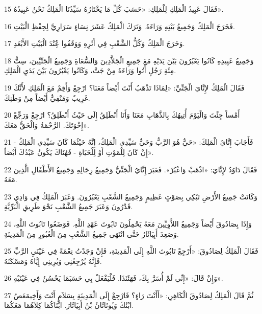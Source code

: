 \par 15 فَقَالَ عَبِيدُ الْمَلِكِ لِلْمَلِكِ: «حَسَبَ كُلِّ مَا يَخْتَارُهُ سَيِّدُنَا الْمَلِكُ نَحْنُ عَبِيدُهُ».
\par 16 فَخَرَجَ الْمَلِكُ وَجَمِيعُ بَيْتِهِ وَرَاءَهُ. وَتَرَكَ الْمَلِكُ عَشَرَ نِسَاءٍ سَرَارِيَّ لِحِفْظِ الْبَيْتِ.
\par 17 وَخَرَجَ الْمَلِكُ وَكُلُّ الشَّعْبِ فِي أَثَرِهِ وَوَقَفُوا عَُِنْدَ الْبَيْتِ الأَبْعَدِ.
\par 18 وَجَمِيعُ عَبِيدِهِ كَانُوا يَعْبُرُونَ بَيْنَ يَدَيْهِ مَعَ جَمِيعِ الْجَلاَّدِينَ وَالسُّعَاةِ وَجَمِيعُ الْجَتِّيِّينَ، سِتُّ مِئَةِ رَجُلٍ أَتُوا وَرَاءَهُ مِنْ جَتَّ، وَكَانُوا يَعْبُرُونَ بَيْنَ يَدَيِ الْمَلِكِ.
\par 19 فَقَالَ الْمَلِكُ لإِتَّايَ الْجَتِّيِّ: «لِمَاذَا تَذْهَبُ أَنْتَ أَيْضاً مَعَنَا؟ ارْجِعْ وَأَقِمْ مَعَ الْمَلِكِ لأَنَّكَ غَرِيبٌ وَمَنْفِيٌّ أَيْضاً مِنْ وَطَنِكَ.
\par 20 أَمْساً جِئْتَ وَالْيَوْمَ أُتِيهُكَ بِالذَّهَابِ مَعَنَا وَأَنَا أَنْطَلِقُ إِلَى حَيْثُ أَنْطَلِقُ؟ ارْجِعْ وَرَجِّعْ إِخْوَتَكَ. الرَّحْمَةُ وَالْحَقُّ مَعَكَ».
\par 21 فَأَجَابَ إِتَّايُ الْمَلِكَ: «حَيٌّ هُوَ الرَّبُّ وَحَيٌّ سَيِّدِي الْمَلِكُ، إِنَّهُ حَيْثُمَا كَانَ سَيِّدِي الْمَلِكُ - إِنْ كَانَ لِلْمَوْتِ أَوْ لِلْحَيَاةِ - فَهُنَاكَ يَكُونُ عَبْدُكَ أَيْضاً».
\par 22 فَقَالَ دَاوُدُ لإِتَّايَ: «اذْهَبْ وَاعْبُرْ». فَعَبَرَ إِتَّايُ الْجَتِّيُّ وَجَمِيعُ رِجَالِهِ وَجَمِيعُ الأَطْفَالِ الَّذِينَ مَعَهُ.
\par 23 وَكَانَتْ جَمِيعُ الأَرْضِ تَبْكِي بِصَوْتٍ عَظِيمٍ وَجَمِيعُ الشَّعْبِ يَعْبُرُونَ. وَعَبَرَ الْمَلِكُ فِي وَادِي قَدْرُونَ وَعَبَرَ جَمِيعُ الشَّعْبِ نَحْوَ طَرِيقِ الْبَرِّيَّةِ.
\par 24 وَإِذَا بِصَادُوقَ أَيْضاً وَجَمِيعُ اللاَّوِيِّينَ مَعَهُ يَحْمِلُونَ تَابُوتَ عَهْدِ اللَّهِ. فَوَضَعُوا تَابُوتَ اللَّهِ، وَصَعِدَ أَبِيَاثَارُ حَتَّى انْتَهَى جَمِيعُ الشَّعْبِ مِنَ الْعُبُورِ مِنَ الْمَدِينَةِ.
\par 25 فَقَالَ الْمَلِكُ لِصَادُوقَ: «أَرْجِعْ تَابُوتَ اللَّهِ إِلَى الْمَدِينَةِ، فَإِنْ وَجَدْتُ نِعْمَةً فِي عَيْنَيِ الرَّبِّ فَإِنَّهُ يُرْجِعُنِي وَيُرِينِي إِيَّاهُ وَمَسْكَنَهُ.
\par 26 وَإِنْ قَالَ: «إِنِّي لَمْ أُسَرَّ بِكَ، فَهَئَنَذَا. فَلْيَفْعَلْ بِي حَسَبَمَا يَحْسُنُ فِي عَيْنَيْهِ».
\par 27 ثُمَّ قَالَ الْمَلِكُ لِصَادُوقَ الْكَاهِنِ: «أَأَنْتَ رَاءٍ؟ فَارْجِعْ إِلَى الْمَدِينَةِ بِسَلاَمٍ أَنْتَ وَأَخِيمَعَصُ ابْنُكَ وَيُونَاثَانُ بْنُ أَبِيَاثَارَ. ابْنَاكُمَا كِلاَهُمَا مَعَكُمَا.
